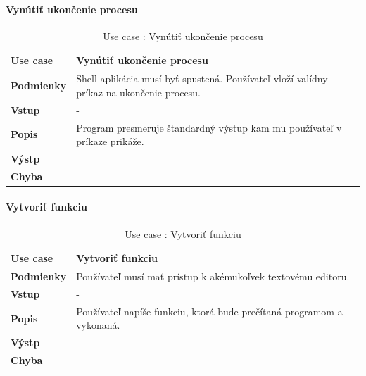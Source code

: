 \paragraph{Vynútiť ukončenie procesu}
\begin{center}
	\begin{table}[htbp]
		\begin{tabular}{|p{2.5cm}|p{14cm}|}
			\hline
			\textbf{Use case} & Vynútiť ukončenie procesu \\ 
			\hline
			\textbf{Podmienky} & Shell aplikácia musí byť spustená. Používateľ vloží valídny príkaz na ukončenie procesu. \\ 
			\hline
			\textbf{Vstup} & -\\
			\hline
			\textbf{Popis} & Program presmeruje štandardný výstup kam mu používateľ v príkaze prikáže.\\ 
			\hline
			\textbf{Výstp} & \\
			\hline
			\textbf{Chyba} & \\
			\hline
		\end{tabular}
		\label{table:1}
		\caption{Use case : Vynútiť ukončenie procesu}
	\end{table}
\end{center}
\newpage
\paragraph{Vytvoriť funkciu}
\begin{center}
	\begin{table}[htbp]
		\begin{tabular}{|p{2.5cm}|p{14cm}|}
			\hline
			\textbf{Use case} & Vytvoriť funkciu \\ 
			\hline
			\textbf{Podmienky} & Používateľ musí mať prístup k akémukoľvek textovému editoru.  \\ 
			\hline
			\textbf{Vstup} & -\\
			\hline
			\textbf{Popis} & Používateľ napíše funkciu, ktorá bude prečítaná programom a vykonaná.\\ 
			\hline
			\textbf{Výstp} & \\
			\hline
			\textbf{Chyba} & \\
			\hline
		\end{tabular}
		\label{table:1}
		\caption{Use case : Vytvoriť funkciu}
	\end{table}
\end{center}
